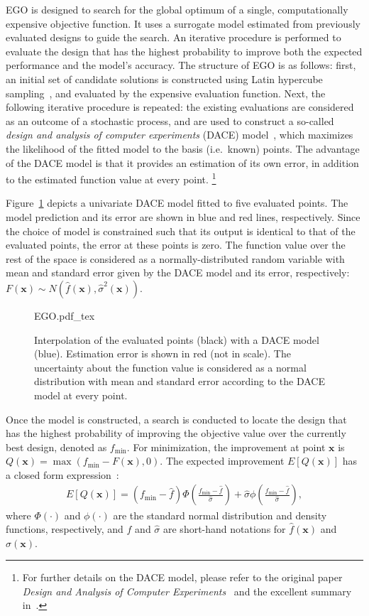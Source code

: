 \documentclass[a4paper]{article}
\newcommand{\brs}[1]{\left[{#1}\right]} %
\newcommand{\brr}[1]{{\left({#1}\right)}} %
\newcommand{\vx}{\ensuremath{\mathbf{x}}} %
\begin{document}
EGO is designed to search for the global optimum of a single, computationally expensive objective function. It uses a surrogate model estimated from previously evaluated designs to guide the search. An iterative procedure is performed to evaluate the design that has the highest probability to improve both the expected performance and the model's accuracy. The structure of EGO is as follows: first, an initial set of candidate solutions is constructed using Latin hypercube sampling~\cite{Scheffe1958Experiments}, and evaluated by the expensive evaluation function. Next, the following iterative procedure is repeated: the existing evaluations are considered as an outcome of a stochastic process, and are used to construct a so-called \emph{design and analysis of computer experiments} (DACE) model~\cite{Sacks1989Design}, which maximizes the likelihood of the fitted model to the basis (i.e.~known) points. The advantage of the DACE model is that it provides an estimation of its own error, in addition to the estimated function value at every point. \footnote{For further details on the DACE model, please refer to the original paper \emph{Design and Analysis of Computer Experiments}~\cite{Sacks1989Design} and the excellent summary in~\cite{Jones1998Efficient}.}

Figure~\ref{fig:EGO} depicts a univariate DACE model fitted to five evaluated points. The model prediction and its error are shown in blue and red lines, respectively. Since the choice of model is constrained such that its output is identical to that of the evaluated points, the error at these points is zero. The function value over the rest of the space is considered as a normally-distributed random variable with mean and standard error given by the DACE model and its error, respectively: $F\brr{\vx}\sim N\brr{\hat{f}\brr{\vx},\hat{\sigma}^2\brr{\vx}}$.
\begin{figure}
	\centering
	\def\svgwidth{\textwidth}
	{EGO.pdf_tex}
	\caption{Interpolation of the evaluated points (black) with a DACE model (blue). Estimation error is shown in red (not in scale). The uncertainty about the function value is considered as a normal distribution with mean and standard error according to the DACE model at every point.}
	\label{fig:EGO}
\end{figure}

Once the model is constructed, a search is conducted to locate the design that has the highest probability of improving the objective value over the currently best design, denoted as $f_\text{min}$. For minimization, the improvement at point $\vx$ is $Q\brr{\vx}=\max\brr{f_\text{min}-F\brr{\vx},0}$. The expected improvement $E\brs{Q\brr{\vx}}$ has a closed form expression~\cite{Jones1998Efficient}:
\begin{align}
E\brs{Q\brr{\vx}} = \brr{f_\text{min}-\hat{f}}\Phi\brr{\frac{f_\text{min}-\hat{f}}{\hat{\sigma}}} + \hat{\sigma}\phi\brr{\frac{f_\text{min}-\hat{f}}{\hat{\sigma}}},
\end{align}
where $\Phi\brr{\cdot}$ and $\phi\brr{\cdot}$  are the standard normal distribution and density functions, respectively, and $\hat{f}$ and $\hat{\sigma}$ are short-hand notations for $\hat{f}\brr{\vx}$ and $\hat{\sigma}\brr{\vx}$.
\end{document}
